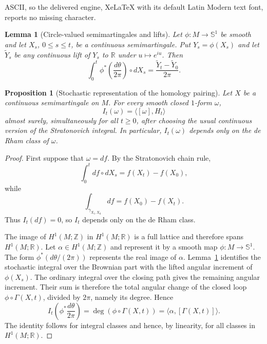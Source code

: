 \documentclass[10pt,a4paper]{amsart}
\newtheorem{lemma}[theorem]{Lemma}
\newtheorem{proposition}[theorem]{Proposition}
\newcommand{\R}{\mathbb R}
\newcommand{\Sph}{\mathbb S}
\newcommand{\Z}{\mathbb Z}
\begin{document}
ASCII, so the delivered engine, XeLaTeX with its default Latin Modern text font, reports no missing character.
\begin{lemma}[Circle-valued semimartingales and lifts]\label{lem:circlelift}
Let $\phi:M\to\Sph^1$ be smooth and let $X_s$, $0\le s\le t$, be a continuous semimartingale.  Put $Y_s=\phi(X_s)$ and let $\widetilde Y_s$ be any continuous lift of $Y_s$ to $\R$ under $u\mapsto e^{iu}$.  Then
\[
 \int_0^t \phi^*\!\left(\frac{d\theta}{2\pi}\right)\circ dX_s
 =\frac{\widetilde Y_t-\widetilde Y_0}{2\pi}.
\]
\end{lemma}

\begin{proposition}[Stochastic representation of the homology pairing]\label{prop:pairing}
Let $X$ be a continuous semimartingale on $M$.  For every smooth closed
$1$-form $\omega$,
\begin{equation}\label{eq:pairingidentity}
   I_t(\omega)=\langle[\omega],H_t\rangle
\end{equation}
almost surely, simultaneously for all $t\ge0$, after choosing the usual
continuous version of the Stratonovich integral.  In particular,
$I_t(\omega)$ depends only on the de Rham class of $\omega$.
\end{proposition}

\begin{proof}
First suppose that $\omega=df$.  By the Stratonovich chain rule,
\[
   \int_0^t df\circ dX_s=f(X_t)-f(X_0),
\]
while
\[
   \int_{\gamma_{X_t,X_0}}df=f(X_0)-f(X_t).
\]
Thus $I_t(df)=0$, so $I_t$ depends only on the de Rham class.

The image of $H^1(M;\Z)$ in $H^1(M;\R)$ is a full lattice and therefore spans $H^1(M;\R)$.  Let $\alpha\in H^1(M;\Z)$ and represent it by a smooth map $\phi:M\to\Sph^1$.  The form $\phi^*(d\theta/(2\pi))$ represents the real image of $\alpha$.  Lemma~\ref{lem:circlelift} identifies the stochastic integral over the Brownian part with the lifted angular increment of $\phi(X_s)$.  The ordinary integral over the closing path gives the remaining angular increment.  Their sum is therefore the total angular change of the closed loop $\phi\circ\Gamma(X,t)$, divided by $2\pi$, namely its degree.  Hence
\[
 I_t\!\left(\phi^*\frac{d\theta}{2\pi}\right)
 =\deg(\phi\circ\Gamma(X,t))
 =\langle\alpha,[\Gamma(X,t)]\rangle.
\]
The identity follows for integral classes and hence, by linearity, for all classes in $H^1(M;\R)$.
\end{proof}
\end{document}
